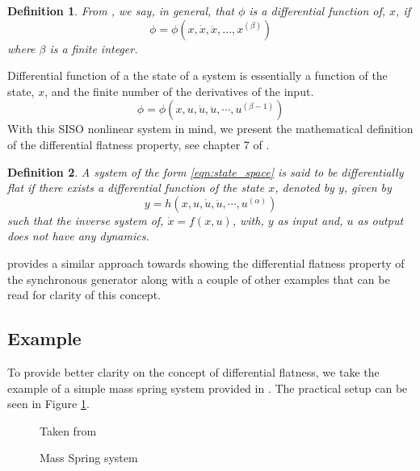 \documentclass[letterpaper%
, twoside%
, 12pt%
,memoire%
, english%
,creativecommons,hyperref%
]{thETS}
\theoremstyle{newThmStyle}
\newtheorem{definitionNewStyle}{Definition}
\begin{document}
\begin{definitionNewStyle}
	From \citep{teschl2012ordinary}, we say, in general, that $\phi$ is a differential function of, $x$, if\\
	\begin{equation*}
		\phi=\phi(x,\dot{x},\ddot{x},...,x^{(\beta)})
	\end{equation*}
	where $\beta$ is a finite integer.
\end{definitionNewStyle}
Differential function of a the state of a system is essentially a function of the state, $x$, and the finite number of the derivatives of the input. 
\begin{equation*}
	\phi=\phi(x,u,\dot{u},\ddot{u},\cdots,u^{(\beta-1)})
\end{equation*}
With this SISO nonlinear system in mind, we present the mathematical definition of the differential flatness property, see chapter 7 of \citep{RN77}. 
\begin{definitionNewStyle} \label{def:diffFlat}
A system of the form \eqref{eqn:state_space} is said to be differentially flat if there exists a differential function of the state $x$, denoted by $y$, given by\\
	\begin{equation} \label{eqn:diffflat}
	y=h(x,u,\dot{u},\ddot{u},\cdots,u^{(\alpha)})
	\end{equation}
	such that the inverse system of, $\dot{x}=f(x,u)$, with, $y$ as input and, $u$ as output does not have any dynamics. 
\end{definitionNewStyle}
\citep{RN120} provides a similar approach towards showing the differential flatness property of the synchronous generator along with a couple of other examples that can be read for clarity of this concept. 
\subsection{Example}
To provide better clarity on the concept of differential flatness, we take the example of a simple mass spring system provided in \citep{levine2009differential}. The practical setup can be seen in Figure \ref{difflin}.
\begin{figure}
	\centering 
	\parbox{0.75\textwidth}{
		\begin{center}
		\caption{Mass Spring system\label{difflin}}Taken from \citep{levine2009differential}
		\end{center}	
	} 
\end{figure}
\end{document}
